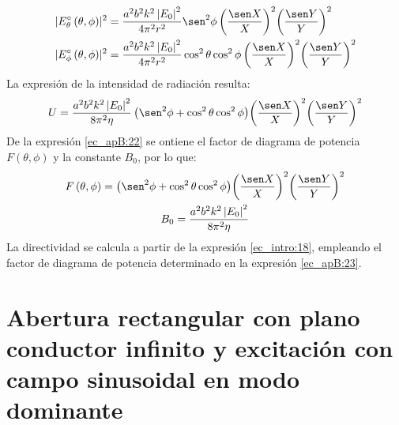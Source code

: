 \begin{subequations}
\label{grup_ec_apB:5}
\begin{align}
\lvert E_{\theta}^{\circ}\left(\theta,\phi\right)\rvert^2 &= \frac{a^2b^2k^2\left|E_0\right|^2}{4\pi^2 r^2}\sen^2\phi\left(\frac{\sen X}{X}\right)^2\!\left(\frac{\sen Y}{Y}\right)^2
\label{ec_apB:20}\\
\lvert E_{\phi}^{\circ}\left(\theta,\phi\right)\rvert^2 &= \frac{a^2b^2k^2\left|E_0\right|^2}{4\pi^2 r^2}\cos^2\theta\cos^2\phi\left(\frac{\sen X}{X}\right)^2\!\left(\frac{\sen Y}{Y}\right)^2
\label{ec_apB:21}
\end{align}
\end{subequations}
La expresión de la intensidad de radiación resulta:
\begin{align}
U = \frac{a^2b^2k^2\left|E_0\right|^2}{8\pi^2\eta}\left(\sen^2\phi + \cos^2\theta\cos^2\phi \right)\!\left(\frac{\sen X}{X}\right)^2\!\left(\frac{\sen Y}{Y}\right)^2
\label{ec_apB:22}
\end{align}
De la expresión \eqref{ec_apB:22} se ontiene el factor de diagrama de potencia $F\left(\theta,\phi\right)$ y la constante $B_0$, por lo que:
\begin{gather}
F\left(\theta,\phi\right) = \left(\sen^2\phi + \cos^2\theta\cos^2\phi \right)\!\left(\frac{\sen X}{X}\right)^2\!\left(\frac{\sen Y}{Y}\right)^2
\label{ec_apB:23}\\
B_0 = \frac{a^2b^2k^2\left|E_0\right|^2}{8\pi^2 \eta}
\label{ec_apB:24}
\end{gather}
La directividad se calcula a partir de la expresión \eqref{ec_intro:18}, empleando el factor de diagrama de potencia determinado en la expresión \eqref{ec_apB:23}.

\section{Abertura rectangular con plano conductor infinito y excitación con campo sinusoidal en modo dominante}
\label{sec_apendice_b_abert_rect_inf_dom}

